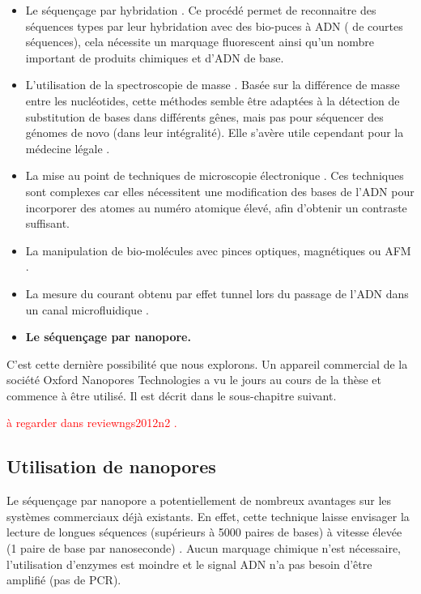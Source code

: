 \begin{itemize}


\item Le séquençage par hybridation \cite{Zhang2003}. Ce procédé permet de reconnaitre des séquences types par leur hybridation avec des bio-puces à ADN ( de courtes séquences), cela nécessite un marquage fluorescent ainsi qu'un nombre important de produits chimiques et d'ADN de base.

\item L'utilisation de la spectroscopie de masse \cite{Edwards2005}. Basée sur la différence de masse entre les nucléotides, cette méthodes semble être adaptées à la détection de substitution de bases dans différents gênes, mais pas pour séquencer des génomes de novo (dans leur intégralité). Elle s'avère utile cependant pour la médecine légale \cite{Howard2013}. 

\item La mise au point de techniques de microscopie électronique \cite{Bell2012}. Ces techniques sont complexes car elles nécessitent une modification des bases de l'ADN pour incorporer des atomes au numéro atomique élevé, afin d'obtenir un contraste suffisant.

\item La manipulation de bio-molécules avec pinces optiques, magnétiques ou AFM \cite{Pareek2011,Ding2012}.

\item La mesure du courant obtenu par effet tunnel lors du passage de l'ADN dans un canal microfluidique \cite{Ohshiro2012,DiVentra2013}.

\item \textbf{Le séquençage par nanopore.}


\end{itemize}


C'est cette dernière possibilité que nous explorons. Un appareil commercial de la société Oxford Nanopores Technologies a vu le jours au cours de la thèse \cite{Mikheyev2014,Goodwin2015,Urban2015} et commence à être utilisé. Il est décrit dans le sous-chapitre suivant.


\textcolor{red}{à regarder dans reviewngs2012n2 \cite{Liu2012}.}

\subsection{Utilisation de nanopores}

Le séquençage par nanopore a potentiellement de nombreux avantages sur les systèmes commerciaux déjà existants. En effet, cette technique laisse envisager la lecture de longues séquences (supérieurs à 5000 paires de bases) à vitesse élevée (1 paire de base par nanoseconde) \cite{Timp2010,Branton2008}. Aucun marquage chimique n'est nécessaire, l'utilisation d'enzymes est moindre et le signal ADN n'a pas besoin d'être amplifié (pas de PCR).

